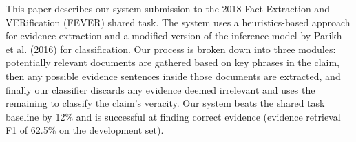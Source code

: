 This paper describes our system submission to the 2018 Fact Extraction and VERification (FEVER) shared task. The system uses a heuristics-based approach for evidence extraction and a modified version of the inference model by Parikh et al. (2016) for classification. Our process is broken down into three modules: potentially relevant documents are gathered based on key phrases in the claim, then any possible evidence sentences inside those documents are extracted, and finally our classifier discards any evidence deemed irrelevant and uses the remaining to classify the claim's veracity. Our system beats the shared task baseline by 12\% and is successful at finding correct evidence (evidence retrieval F1 of 62.5\% on the development set).
